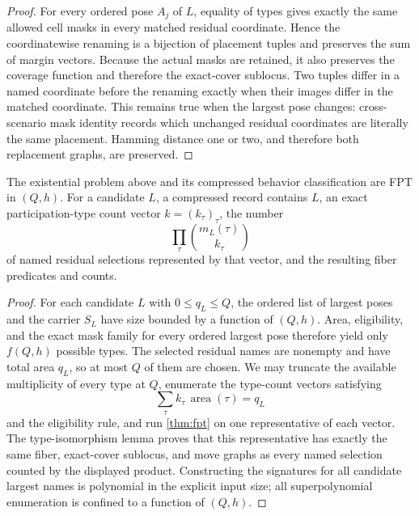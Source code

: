 \begin{proof}
For every ordered pose \(A_j\) of \(L\), equality of types gives exactly the
same allowed cell masks in every matched residual coordinate.  Hence the
coordinatewise renaming is a bijection of placement tuples and preserves the
sum of margin vectors.  Because the actual masks are retained, it also
preserves the coverage function and therefore the exact-cover sublocus.
Two tuples differ in a named coordinate before the renaming exactly when
their images differ in the matched coordinate.  This remains true when the
largest pose changes: cross-scenario mask identity records which unchanged
residual coordinates are literally the same placement.  Hamming distance
one or two, and therefore both replacement graphs, are preserved.
\end{proof}

\begin{proposition}\label{prop:types}
The existential problem above and its compressed behavior classification are
FPT in \((Q,h)\).  For a candidate \(L\), a compressed record contains \(L\),
an exact participation-type count vector \(k=(k_\tau)_\tau\), the number
\[
 \prod_\tau \binom{m_L(\tau)}{k_\tau}
\]
of named residual selections represented by that vector, and the resulting
fiber predicates and counts.
\end{proposition}

\begin{proof}
For each candidate \(L\) with \(0\leq q_L\leq Q\), the ordered list of
largest poses and the carrier \(S_L\) have size bounded by a function of
\((Q,h)\).  Area, eligibility, and the exact mask family for every ordered
largest pose therefore yield only \(f(Q,h)\) possible types.  The selected
residual names are nonempty and have total area \(q_L\), so at most \(Q\) of
them are chosen.  We may truncate the available multiplicity of every type
at \(Q\), enumerate the type-count vectors satisfying
\[
 \sum_\tau k_\tau\,\operatorname{area}(\tau)=q_L
\]
and the eligibility rule, and run \cref{thm:fpt} on one representative of
each vector.  The type-isomorphism lemma proves that this representative has
exactly the same fiber, exact-cover sublocus, and move graphs as every named
selection counted by the displayed product.  Constructing the signatures
for all candidate largest names is polynomial in the explicit input size;
all superpolynomial enumeration is confined to a function of \((Q,h)\).
\end{proof}

